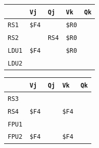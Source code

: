 \begin{enumerate}
    \begin{minipage}{0.45\textwidth}
        \centering
        \begin{tabular}{@{} l | l l l l @{}}
            \toprule
                & \texttt{Vj} & \texttt{Qj} & \texttt{Vk} & \texttt{Qk} \\
            \midrule
            \texttt{RS1} & \texttt{\$F4} & & \texttt{\$R0} & \\ [.3em]
            \texttt{RS2} & & \texttt{RS4} & \texttt{\$R0} & \\
            \cmidrule{1-5}
            \texttt{LDU1} & \texttt{\$F4} & & \texttt{\$R0} & \\ [.3em]
            \texttt{LDU2} & & & & \\
            \bottomrule
        \end{tabular}
    \end{minipage}
    \hfill
    \begin{minipage}{0.45\textwidth}
        \centering
        \begin{tabular}{@{} l | l l l l @{}}
            \toprule
            & \texttt{Vj} & \texttt{Qj} & \texttt{Vk} & \texttt{Qk} \\
            \midrule
            \texttt{RS3} & & & & \\ [.3em]
            \texttt{RS4} & \texttt{\$F4} & & \texttt{\$F4} & \\
            \cmidrule{1-5}
            \texttt{FPU1} & & & & \\ [.3em]
            \texttt{FPU2} & \texttt{\$F4} & & \texttt{\$F4} & \\
            \bottomrule
        \end{tabular}
    \end{minipage}


\end{enumerate}
